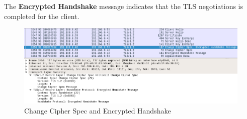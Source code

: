 \documentclass[a4paper,12pt]{article}
\begin{document}
The \textbf{Encrypted Handshake} message indicates that the TLS negotiations is completed for the client.
\begin{figure}[H]
    \centering
    \includegraphics[scale=0.400]{./code/img/client-change-cipher.png}
    \caption{Change Cipher Spec and Encrypted Handshake}
\end{figure}
\end{document}
